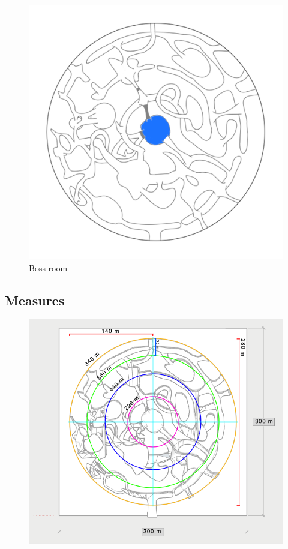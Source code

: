 \begin{figure}[H]
	\centering
	\includegraphics[width=0.7\linewidth]{images/map/2D_map_section_04.png}
	\caption*{Boss room}
\end{figure}
\newpage


\subsection{Measures}
\begin{figure}[H]
	\centering
	\includegraphics[width=14cm]{images/map/map_measures.png}
\end{figure}

